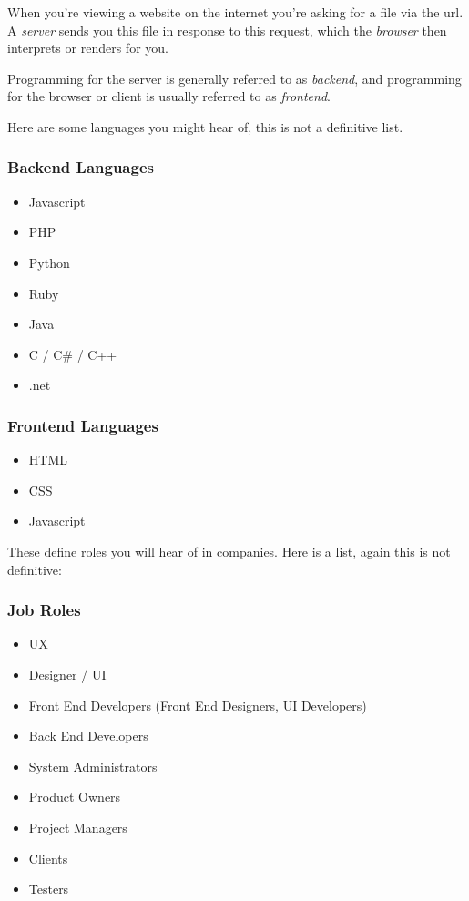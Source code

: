 When you're viewing a website on the internet you're asking for a file via the url. A \textit{server} sends you this file in response to this request, which the \textit{browser} then interprets or renders for you.

Programming for the server is generally referred to as \textit{backend}, and programming for the browser or client is usually referred to as \textit{frontend}.

Here are some languages you might hear of, this is not a definitive list.

\subsubsection{Backend Languages}

\begin{itemize}
    \item Javascript
    \item PHP
    \item Python
    \item Ruby
    \item Java
    \item C / C\# / C++
    \item .net
\end{itemize}

\subsubsection{Frontend Languages}

\begin{itemize}
    \item HTML
    \item CSS
    \item Javascript
\end{itemize}

These define roles you will hear of in companies. Here is a list, again this is not definitive:

\subsubsection{Job Roles}

\begin{itemize}
    \item UX
    \item Designer / UI
    \item Front End Developers (Front End Designers, UI Developers)
    \item Back End Developers
    \item System Administrators
    \item Product Owners
    \item Project Managers
    \item Clients
    \item Testers
\end{itemize}

